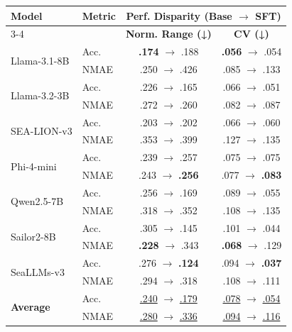 \begin{tabular}{@{}l l | c | c@{}}
\toprule
\multirow{2}{*}{\textbf{Model}} & \multirow{2}{*}{\textbf{Metric}} & \multicolumn{2}{c}{\textbf{Perf. Disparity (Base $\rightarrow$ SFT)}} \\
\cmidrule(lr){3-4}
& & \textbf{Norm. Range (↓)} & \textbf{CV (↓)} \\
\midrule
\multirow{2}{*}{Llama-3.1-8B}
 & Acc. & \textbf{.174} $\rightarrow$ .188 & \textbf{.056} $\rightarrow$ .054 \\
 & NMAE & .250 $\rightarrow$ .426 & .085 $\rightarrow$ .133 \\
\midrule
\multirow{2}{*}{Llama-3.2-3B}
 & Acc. & .226 $\rightarrow$ .165 & .066 $\rightarrow$ .051 \\
 & NMAE & .272 $\rightarrow$ .260 & .082 $\rightarrow$ .087 \\
\midrule
\multirow{2}{*}{SEA-LION-v3}
 & Acc. & .203 $\rightarrow$ .202 & .066 $\rightarrow$ .060 \\
 & NMAE & .353 $\rightarrow$ .399 & .127 $\rightarrow$ .135 \\
\midrule
\multirow{2}{*}{Phi-4-mini}
 & Acc. & .239 $\rightarrow$ .257 & .075 $\rightarrow$ .075 \\
 & NMAE & .243 $\rightarrow$ \textbf{.256} & .077 $\rightarrow$ \textbf{.083} \\
\midrule
\multirow{2}{*}{Qwen2.5-7B}
 & Acc. & .256 $\rightarrow$ .169 & .089 $\rightarrow$ .055 \\
 & NMAE & .318 $\rightarrow$ .352 & .108 $\rightarrow$ .135 \\
\midrule
\multirow{2}{*}{Sailor2-8B}
 & Acc. & .305 $\rightarrow$ .145 & .101 $\rightarrow$ .044 \\
 & NMAE & \textbf{.228} $\rightarrow$ .343 & \textbf{.068} $\rightarrow$ .129 \\
\midrule
\multirow{2}{*}{SeaLLMs-v3}
 & Acc. & .276 $\rightarrow$ \textbf{.124} & .094 $\rightarrow$ \textbf{.037} \\
 & NMAE & .294 $\rightarrow$ .318 & .108 $\rightarrow$ .111 \\
\midrule
\multirow{2}{*}{\textbf{Average}}
 & Acc. & \underline{.240} $\rightarrow$ \underline{.179} & \underline{.078} $\rightarrow$ \underline{.054} \\
 & NMAE & \underline{.280} $\rightarrow$ \underline{.336} & \underline{.094} $\rightarrow$ \underline{.116} \\
\bottomrule
\end{tabular}

